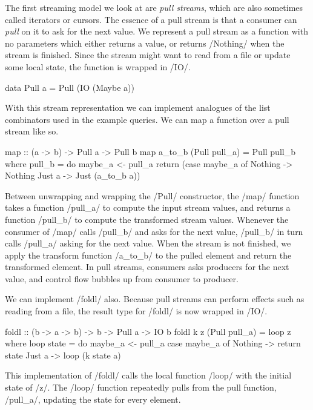 The first streaming model we look at are \emph{pull streams}, which are also sometimes called iterators or cursors.
The essence of a pull stream is that a consumer can \emph{pull} on it to ask for the next value.
We represent a pull stream as a function with no parameters which either returns a value, or returns \Hs/Nothing/ when the stream is finished.
Since the stream might want to read from a file or update some local state, the function is wrapped in \Hs/IO/.

\begin{haskell}
data Pull a = Pull (IO (Maybe a))
\end{haskell}

With this stream representation we can implement analogues of the list combinators used in the example queries.
We can map a function over a pull stream like so.

\begin{haskell}
map :: (a -> b) -> Pull a -> Pull b
map a_to_b (Pull pull_a) = Pull pull_b
 where
  pull_b = do
    maybe_a <- pull_a
    return (case maybe_a of
             Nothing -> Nothing
             Just a  -> Just (a_to_b a))
\end{haskell}

Between unwrapping and wrapping the \Hs/Pull/ constructor, the \Hs/map/ function takes a function \Hs/pull_a/ to compute the input stream values, and returns a function \Hs/pull_b/ to compute the transformed stream values.
Whenever the consumer of \Hs/map/ calls \Hs/pull_b/ and asks for the next value, \Hs/pull_b/ in turn calls \Hs/pull_a/ asking for the next value.
When the stream is not finished, we apply the transform function \Hs/a_to_b/ to the pulled element and return the transformed element.
In pull streams, consumers asks producers for the next value, and control flow bubbles up from consumer to producer.

We can implement \Hs/foldl/ also.
Because pull streams can perform effects such as reading from a file, the result type for \Hs/foldl/ is now wrapped in \Hs/IO/.

\begin{haskell}
foldl :: (b -> a -> b) -> b -> Pull a -> IO b
foldl k z (Pull pull_a) = loop z
 where
  loop state = do
    maybe_a <- pull_a
    case maybe_a of
      Nothing -> return state
      Just a -> loop (k state a)
\end{haskell}

This implementation of \Hs/foldl/ calls the local function \Hs/loop/ with the initial state of \Hs/z/.
The \Hs/loop/ function repeatedly pulls from the pull function, \Hs/pull_a/, updating the state for every element.

